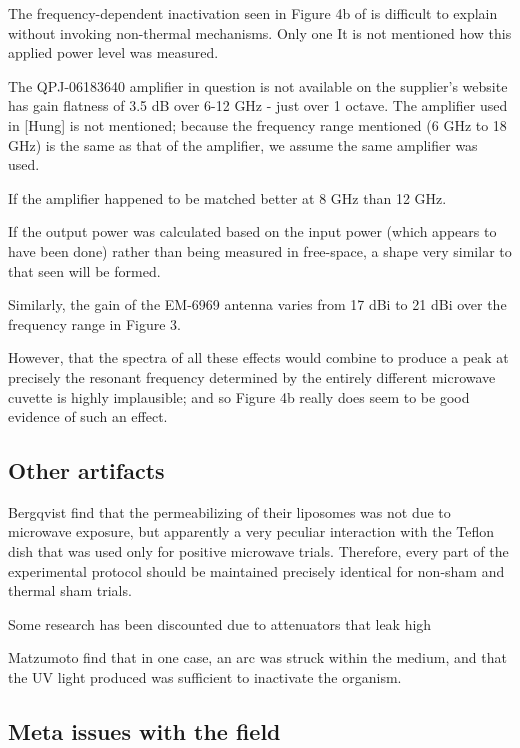 \documentclass[paper.tex]{subfiles}
\begin{document}
The frequency-dependent inactivation seen in Figure 4b of \cite{Efficient2015} is difficult to explain without invoking non-thermal mechanisms. Only one  It is not mentioned how this applied power level was measured. 

The QPJ-06183640 amplifier in question is not available on the supplier's website \cite{Microwaved} has gain flatness of 3.5 dB over 6-12 GHz - just over 1 octave. The amplifier used in [Hung] is not mentioned; because the frequency range mentioned (6 GHz to 18 GHz) is the same as that of the amplifier, we assume the same amplifier was used. 

If the amplifier happened to be matched better at 8 GHz than 12 GHz.

If the output power was calculated based on the input power (which appears to have been done) rather than being measured in free-space, a shape very similar to that seen will be formed.

Similarly, the gain of the EM-6969 antenna\cite{EM6969} varies from 17 dBi to 21 dBi over the frequency range in Figure 3.

However, that the spectra of all these effects would combine to produce a peak at precisely the resonant frequency determined by the entirely different microwave cuvette is highly implausible; and so Figure 4b really does seem to be good evidence of such an effect.


\subsection{Other artifacts}

Bergqvist \cite{Effect1994a} find that the permeabilizing of their liposomes was not due to microwave exposure, but apparently a very peculiar interaction with the Teflon dish that was used only for positive microwave trials. Therefore, every part of the experimental protocol should be maintained precisely identical for non-sham and thermal sham trials.

Some research has been discounted due to attenuators that leak high 

Matzumoto \cite{Inactivation1991} find that in one case, an arc was struck within the medium, and that the UV light produced was sufficient to inactivate the organism.


\subsection{Meta issues with the field}
\end{document}
